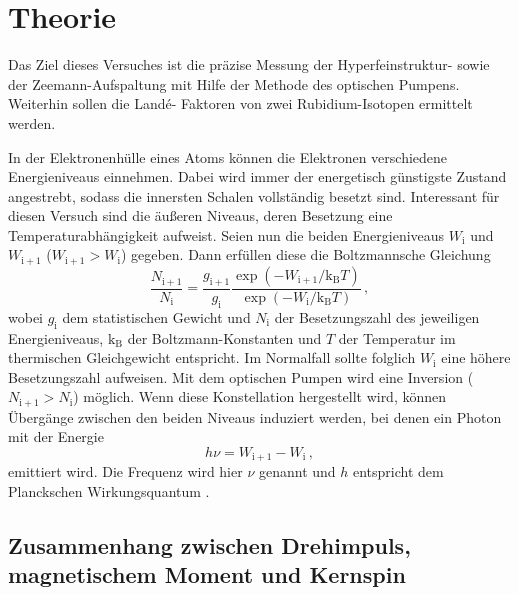 \section{Theorie}
\label{sec:Theorie}
Das Ziel dieses Versuches ist die präzise Messung der Hyperfeinstruktur- sowie
der Zeemann-Aufspaltung mit Hilfe der Methode des optischen Pumpens. Weiterhin sollen die Land\'{e}-
Faktoren von zwei Rubidium-Isotopen ermittelt werden.

In der Elektronenhülle eines Atoms können die Elektronen verschiedene Energieniveaus einnehmen.
Dabei wird immer der energetisch günstigste Zustand angestrebt, sodass die innersten Schalen
vollständig besetzt sind. Interessant für diesen Versuch sind die äußeren Niveaus, deren
Besetzung eine Temperaturabhängigkeit aufweist. Seien nun die beiden Energieniveaus
$W_{\mathrm{i}}$ und $W_{\mathrm{i}+1}$ ($W_{\mathrm{i}+1} >  W_{\mathrm{i}}$) gegeben.
Dann erfüllen diese die Boltzmannsche Gleichung
\begin{equation}
	\frac{N_{\mathrm{i}+1}}{N_{\mathrm{i}}} = \frac{g_{\mathrm{i}+1}}{g_{\mathrm{i}}} \frac{\exp(-W_{\mathrm{i}+1} / \mathrm{k}_{\mathrm{B}}T)}{\exp(-W_{\mathrm{i}} / \mathrm{k}_{\mathrm{B}}T)} \, \mathrm{,}
\end{equation}
wobei $g_{\mathrm{i}}$ dem statistischen Gewicht und $N_{\mathrm{i}}$ der Besetzungszahl
des jeweiligen Energieniveaus,
$\mathrm{k}_{\mathrm{B}}$ der Boltzmann-Konstanten \cite{k_b} und $T$ der Temperatur im thermischen
Gleichgewicht entspricht.
Im Normalfall sollte folglich $W_{\mathrm{i}}$ eine höhere Besetzungszahl aufweisen.
Mit dem optischen Pumpen wird eine Inversion ($N_{\mathrm{i}+1} > N_{\mathrm{i}}$) möglich.
Wenn diese Konstellation hergestellt wird, können Übergänge zwischen den beiden Niveaus
induziert werden, bei denen ein Photon mit der Energie
\begin{equation}
	h \nu = W_{\mathrm{i}+1} - W_{\mathrm{i}} \, \mathrm{,}
\end{equation}
emittiert wird. Die Frequenz wird hier $\nu$ genannt und $h$ entspricht dem Planckschen
Wirkungsquantum \cite{h}.

\subsection{Zusammenhang zwischen Drehimpuls, magnetischem Moment und Kernspin}

